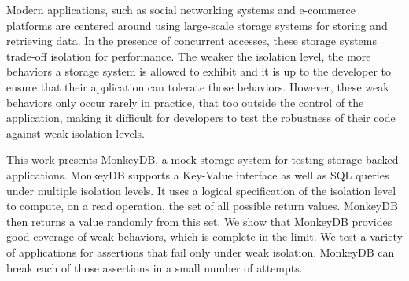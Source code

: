 
Modern applications, such as social networking systems and e-commerce platforms
are centered around using large-scale storage systems for storing and retrieving
data. In the presence of concurrent accesses, these storage systems trade-off isolation
for performance. The weaker the isolation level, the more behaviors a storage
system is allowed to exhibit and it is up to the developer to ensure that their
application can tolerate those behaviors. However, these weak behaviors only
occur rarely in practice, that too outside the control of the application, 
making it difficult for developers to test the robustness of their 
code against weak isolation levels. 

This work presents MonkeyDB, a mock storage system for testing storage-backed
applications. MonkeyDB supports a Key-Value interface as well as SQL queries
under multiple isolation levels. It uses a logical specification of the isolation
level to compute, on a read operation, the set of all possible return values.
MonkeyDB then returns a value randomly from this set. 
We show that MonkeyDB provides 
good coverage of weak behaviors, which is complete in the limit. We test a
variety of applications for assertions that fail only under weak isolation.
MonkeyDB can break each of those assertions in a small number of attempts. 
